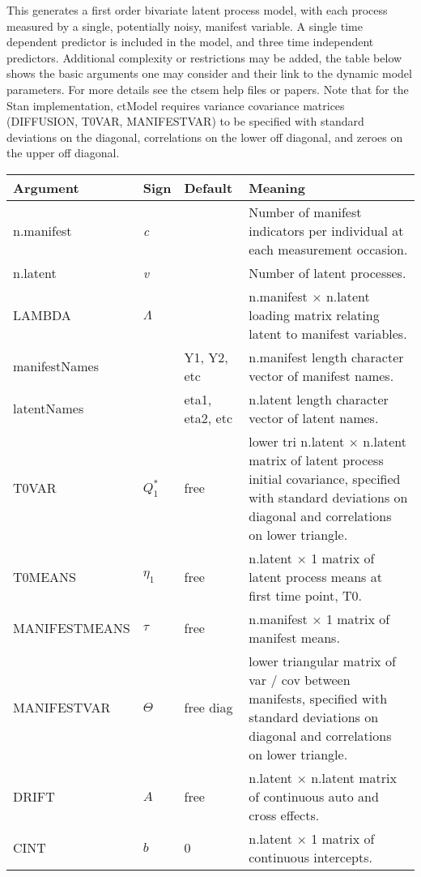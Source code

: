 \documentclass[nojss]{jss}\usepackage[]{graphicx}\usepackage[]{color}
\begin{document}
This generates a first order bivariate latent process model, with each process measured by a single, potentially noisy, manifest variable. A single time dependent predictor is included in the model, and three time independent predictors. Additional complexity or restrictions may be added, the table below shows the basic arguments one may consider and their link to the dynamic model parameters. For more details see the ctsem help files or papers. Note that for the Stan implementation, ctModel requires variance covariance matrices (DIFFUSION, T0VAR, MANIFESTVAR) to be specified with standard deviations on the diagonal, correlations on the lower off diagonal, and zeroes on the upper off diagonal. 

\begin{table}\footnotesize
\begin{tabular}{l|l|l p{8cm} }
\textbf{Argument} & \textbf{Sign} & \textbf{Default} & \textbf{Meaning}\\
\hline
 n.manifest & \textit{c} & & Number of manifest indicators per individual at each measurement occasion.\\
 n.latent & \textit{v} & & Number of latent processes.\\
 LAMBDA & $\Lambda$& & n.manifest $\times$ n.latent loading matrix relating latent to manifest variables.\\
 manifestNames & & Y1, Y2, etc & n.manifest length character vector of manifest names.\\
 latentNames & & eta1, eta2, etc & n.latent length character vector of latent names.\\
 T0VAR & $Q^*_1$ & free & lower tri n.latent $\times$ n.latent matrix of latent process initial covariance, specified with standard deviations on diagonal and correlations on lower triangle.\\
 T0MEANS & $\eta_1$ & free & n.latent $\times$ 1 matrix of latent process means at first time point, T0.\\
 MANIFESTMEANS & $\tau$ & free & n.manifest $\times$ 1 matrix of manifest means.\\
 MANIFESTVAR & $\Theta$ & free diag & lower triangular matrix of var / cov between manifests, specified with standard deviations on diagonal and correlations on lower triangle.\\
 DRIFT & $A$ & free & n.latent $\times$ n.latent matrix of continuous auto and cross effects.\\
 CINT & $b$ & 0 & n.latent $\times$ 1 matrix of continuous intercepts.\\

\end{tabular}
\end{table}
\end{document}

